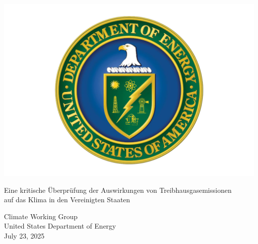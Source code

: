 \documentclass[12pt,paper=a4,DIV=12,parskip=never,chapterprefix=false,headings=standardclasses]{scrreprt}
\begin{document}
\begin{titlepage}
\centering
\vspace*{-0.5cm}
\includegraphics[width=1.0\textwidth]{bilder/bilderKlima-0000.png}\\[1cm]

{\huge Eine kritische Überprüfung der Auswirkungen von Treibhausgasemissionen\\
auf das Klima in den Vereinigten Staaten\par}
\vfill
\begin{flushleft}
\Large
Climate Working Group\\
United States Department of Energy\\
July 23, 2025
\end{flushleft}
\vfill
\end{titlepage}

\newpage
\thispagestyle{empty}
\mbox{}
\newpage
\end{document}
